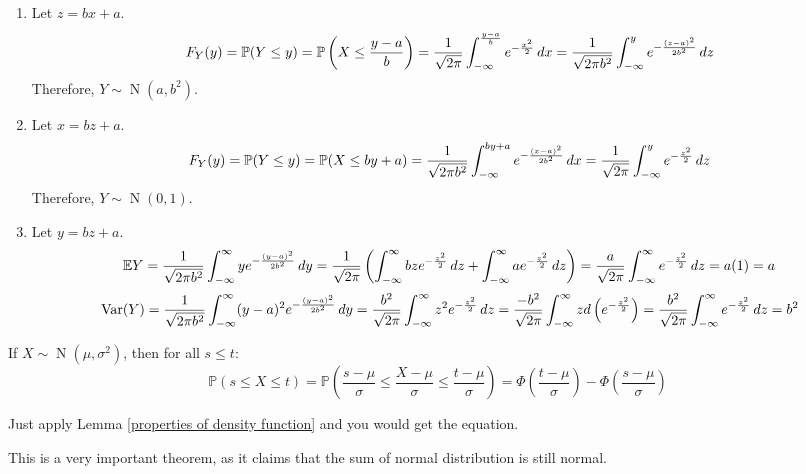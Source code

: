 \documentclass{huhtakm-template-book}
\newcommand{\prob}{\mathbb{P}}
\newcommand{\expect}{\mathbb{E}}
\DeclareMathOperator{\N}{N}
\DeclareMathOperator{\Var}{Var}
\begin{document}
\begin{proofing}
	\begin{enumerate}
		\item Let $z=bx+a$.
		\begin{equation*}
			F_{Y}(y)=\prob(Y\leq y)=\prob\left(X\leq\frac{y-a}{b}\right)=\frac{1}{\sqrt{2\pi}}\intlu{-\infty}{\frac{y-a}{b}}e^{-\frac{x^{2}}{2}}\,dx=\frac{1}{\sqrt{2\pi b^{2}}}\intlu{-\infty}{y}e^{-\frac{(z-a)^{2}}{2b^{2}}}\,dz
		\end{equation*}
		Therefore, $Y\sim\N(a,b^{2})$.
		\item Let $x=bz+a$.
		\begin{equation*}
			F_{Y}(y)=\prob(Y\leq y)=\prob(X\leq by+a)=\frac{1}{\sqrt{2\pi b^{2}}}\intlu{-\infty}{by+a}e^{-\frac{(x-a)^{2}}{2b^{2}}}\,dx=\frac{1}{\sqrt{2\pi}}\intlu{-\infty}{y}e^{-\frac{z^{2}}{2}}\,dz
		\end{equation*}
		Therefore, $Y\sim\N(0,1)$.
		\item Let $y=bz+a$.
		\begin{equation*}
			\expect Y=\frac{1}{\sqrt{2\pi b^{2}}}\intinfty ye^{-\frac{(y-a)^{2}}{2b^{2}}}\,dy=\frac{1}{\sqrt{2\pi}}\left(\intinfty bze^{-\frac{z^{2}}{2}}\,dz+\intinfty ae^{-\frac{z^{2}}{2}}\,dz\right)=\frac{a}{\sqrt{2\pi}}\intinfty e^{-\frac{z^{2}}{2}}\,dz=a(1)=a
		\end{equation*}
		\begin{equation*}
			\Var(Y)=\frac{1}{\sqrt{2\pi b^{2}}}\intinfty(y-a)^{2}e^{-\frac{(y-a)^{2}}{2b^{2}}}\,dy=\frac{b^{2}}{\sqrt{2\pi}}\intinfty z^{2}e^{-\frac{z^{2}}{2}}\,dz=\frac{-b^{2}}{\sqrt{2\pi}}\intinfty zd\left(e^{-\frac{z^{2}}{2}}\right)=\frac{b^{2}}{\sqrt{2\pi}}\intinfty e^{-\frac{z^{2}}{2}}\,dz=b^{2}
		\end{equation*}
	\end{enumerate}
\end{proofing}
\begin{lem}
	If $X\sim\N(\mu,\sigma^{2})$, then for all $s\leq t$:
	\begin{equation*}
		\prob(s\leq X\leq t)=\prob\left(\frac{s-\mu}{\sigma}\leq\frac{X-\mu}{\sigma}\leq\frac{t-\mu}{\sigma}\right)=\Phi\left(\frac{t-\mu}{\sigma}\right)-\Phi\left(\frac{s-\mu}{\sigma}\right)
	\end{equation*}
\end{lem}
\begin{proofing}
	Just apply Lemma \ref{properties of density function} and you would get the equation.
\end{proofing}
This is a very important theorem, as it claims that the sum of normal distribution is still normal.
\end{document}
